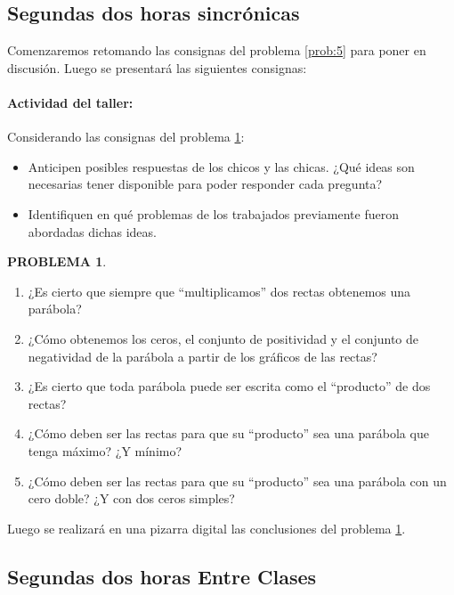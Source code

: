\documentclass[oneside,spanish]{amsart}
\numberwithin{equation}{section}
\numberwithin{figure}{section}
\theoremstyle{definition}
\newtheorem{problema}{\normalfont PROBLEMA}
\begin{document}
\subsection{Segundas dos horas sincrónicas}\label{subsec:segundas-dos}

Comenzaremos retomando las consignas del problema \ref{prob:5} para poner en discusión. Luego se presentará las siguientes consignas:

\paragraph{Actividad del taller:}

Considerando las consignas del problema \ref{prob:6}:

\begin{itemize}[-]
	\item Anticipen posibles respuestas de los chicos y las chicas. ¿Qué ideas son necesarias tener disponible para poder responder cada pregunta? 
	\item Identifiquen en qué problemas de los trabajados previamente fueron abordadas dichas ideas.
\end{itemize}

\begin{problema}\label{prob:6}

\begin{enumerate}[1.]
	\item ¿Es cierto que siempre que “multiplicamos” dos rectas obtenemos una parábola?
	\item ¿Cómo obtenemos los ceros, el conjunto de positividad y el conjunto de negatividad de la parábola a partir de los gráficos de las rectas?
	\item ¿Es cierto que toda parábola puede ser escrita como el “producto” de dos rectas?
	\item ¿Cómo deben ser las rectas para que su “producto” sea una parábola que tenga máximo? ¿Y mínimo?
	\item ¿Cómo deben ser las rectas para que su “producto” sea una parábola con un cero doble? ¿Y con dos ceros simples?
\end{enumerate}
\end{problema}

Luego se realizará en una pizarra digital las conclusiones del problema \ref{prob:6}.

\subsection{Segundas dos horas Entre Clases}\label{subsec:segundas-dos-EC}
\end{document}
